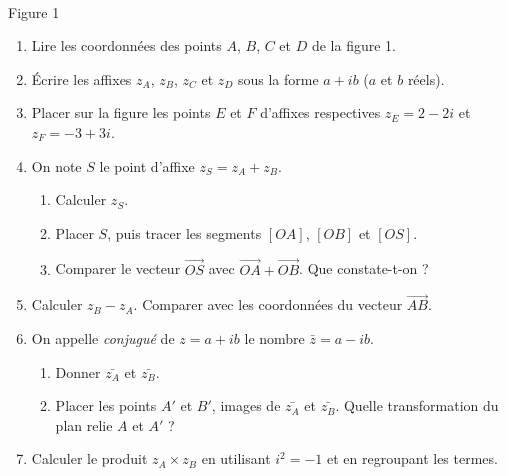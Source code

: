 \documentclass[11pt,a4paper]{article}
\begin{document}
\begin{center}
\\[2pt]
{\footnotesize Figure 1}
\end{center}

\begin{enumerate}[label=\textbf{\arabic*.}]
  \item Lire les coordonnées des points $A$, $B$, $C$ et $D$ de la figure 1.
  \item Écrire les affixes $z_A$, $z_B$, $z_C$ et $z_D$ sous la forme $a + ib$
        ($a$ et $b$ réels).
  \item Placer sur la figure les points $E$ et $F$ d'affixes respectives
        $z_E = 2 - 2i$ et $z_F = -3 + 3i$.
  \item On note $S$ le point d'affixe $z_S = z_A + z_B$.
    \begin{enumerate}
      \item Calculer $z_S$.
      \item Placer $S$, puis tracer les segments $[OA]$, $[OB]$ et $[OS]$.
      \item Comparer le vecteur $\overrightarrow{OS}$ avec $\overrightarrow{OA}+\overrightarrow{OB}$.
            Que constate-t-on ?
    \end{enumerate}
  \item Calculer $z_B - z_A$. Comparer avec les coordonnées du vecteur $\overrightarrow{AB}$.
  \item On appelle \emph{conjugué} de $z = a+ib$ le nombre $\bar{z} = a - ib$.
    \begin{enumerate}
      \item Donner $\bar{z_A}$ et $\bar{z_B}$.
      \item Placer les points $A'$ et $B'$, images de $\bar{z_A}$ et $\bar{z_B}$.
            Quelle transformation du plan relie $A$ et $A'$ ?
    \end{enumerate}
  \item Calculer le produit $z_A \times z_B$ en utilisant $i^2 = -1$ et en regroupant les termes.
\end{enumerate}
\end{document}
